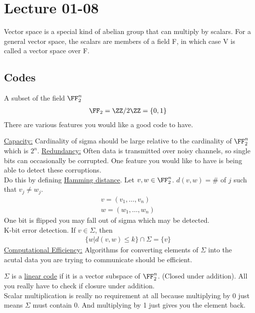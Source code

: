 \documentclass[class=scrartcl, crop=false]{standalone}
\date{2020-01-08}
\begin{document}
\section{Lecture 01-08}

\begin{definition}
  Vector space is a special kind of abelian group that can multiply by scalars.
  For a general vector space, the scalars are members of a field F, in which case V is called a vector space over F. 
\end{definition} 

\subsection{Codes}

\begin{definition}[Codes]
  A subset of the field $\FF_2^n$ 
  \begin{gather*}
    \FF_2 = \ZZ / 2 \ZZ = \{0, 1\}
  \end{gather*} 
  There are various features you would like a good code to have.
  \begin{enumerate}
    \ii
    \ul{Capacity:} Cardinality of sigma should be large relative to the cardinality of $\FF_2^n$ which is $2^n$.
    \ii
    \ul{Redundancy:} Often data is transmitted over noisy channels, so single bits can occasionally be corrupted. One feature you would like to have is being able to detect these corruptions. 
    \\
    Do this by defining \ul{Hamming distance}. Let  $v, w \in \FF_2^n$. $d(v, w) = \#$ of $j$ such that $v_j \neq w_j$.
    \begin{gather*}
      v = (v_1, \dots, v_n) \\
      w = (w_1, \dots, w_n)
    \end{gather*} 
    One bit is flipped you may fall out of sigma which may be detected.
    \\
    K-bit error detection. If $v \in \Sigma$, then 
    \begin{gather*}
      \{w | d(v, w) \leq k\} \cap \Sigma = \{v\}
    \end{gather*} 
    \ii
    \ul{Computational Efficiency:} Algorithms for converting elements of $\Sigma$ into the acutal data you are trying to communicate should be efficient.
    \begin{definition}
      $\Sigma$ is a \ul{linear code} if it is a vector subspace of $\FF_2^n$. (Closed under addition). All you really have to check if closure under addition.
      \\
      Scalar multiplication is really no requirement at all because multiplying by 0 just means $\Sigma$ must contain 0. And multiplying by 1 just gives you the element back.
    \end{definition} 
  \end{enumerate} 
\end{definition} 
\end{document}
